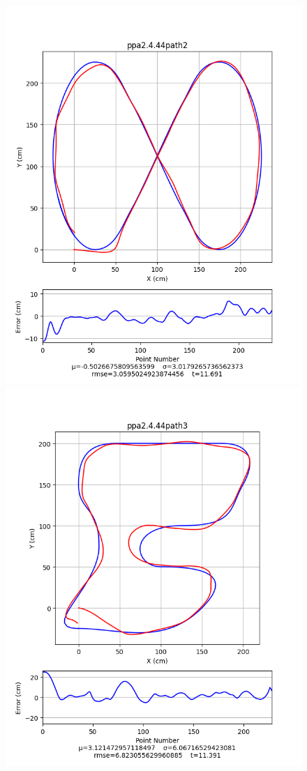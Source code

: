\documentclass[12pt]{article}
\begin{document}
\begin{flushleft}
\begin{figure}[H]
\includegraphics[width=\linewidth]{images/pathData/ppa2path2}
\endminipage\\
\includegraphics[width=\linewidth]{images/pathData/ppa2path3}

\end{figure}
\end{flushleft}
\end{document}
